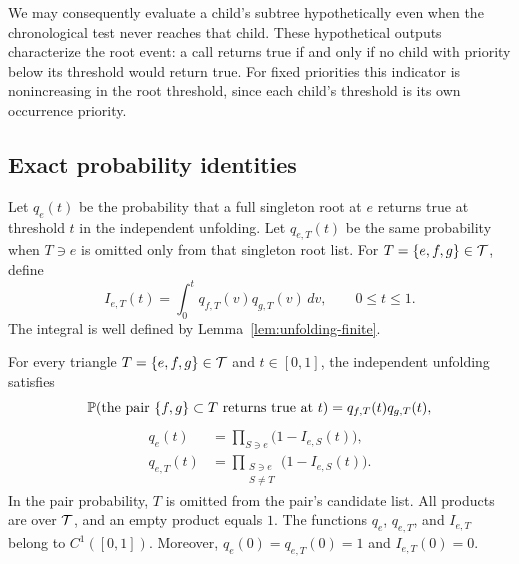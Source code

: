 We may consequently evaluate a child's subtree hypothetically even
when the chronological test never reaches that child.  These
hypothetical outputs characterize the root event: a call returns true
if and only if no child with priority below its threshold would return
true.  For fixed priorities this indicator is nonincreasing in the
root threshold, since each child's threshold is its own occurrence
priority.

\subsection{Exact probability identities}

Let $q_e(t)$ be the probability that a full singleton root at $e$
returns true at threshold $t$ in the independent unfolding.  Let
$q_{e,T}(t)$ be the same probability when $T\ni e$ is omitted only
from that singleton root list.  For $T=\{e,f,g\}\in\mathcal T$, define
\begin{equation}\label{eq:integral}
 I_{e,T}(t)=\int_0^t q_{f,T}(v)q_{g,T}(v)\,dv,
 \qquad 0\le t\le1.
\end{equation}
The integral is well defined by Lemma~\ref{lem:unfolding-finite}.

\begin{proposition}\label{prop:products}
For every triangle $T=\{e,f,g\}\in\mathcal T$ and $t\in[0,1]$, the
independent unfolding satisfies
\begin{equation}\label{eq:pair}
 \mathbb P(\text{the pair $\{f,g\}\subset T$ returns true at $t$})
   =q_{f,T}(t)q_{g,T}(t),
\end{equation}
\begin{equation}\label{eq:products}
 \begin{aligned}
 q_e(t)&=\prod_{S\ni e}\bigl(1-I_{e,S}(t)\bigr),\\
 q_{e,T}(t)&=\prod_{\substack{S\ni e\\S\ne T}}
                    \bigl(1-I_{e,S}(t)\bigr).
 \end{aligned}
\end{equation}
In the pair probability, $T$ is omitted from the pair's candidate list.
All products are over $\mathcal T$, and an empty product equals $1$.
The functions $q_e$, $q_{e,T}$, and $I_{e,T}$ belong to $C^1([0,1])$.
Moreover, $q_e(0)=q_{e,T}(0)=1$ and $I_{e,T}(0)=0$.
\end{proposition}

